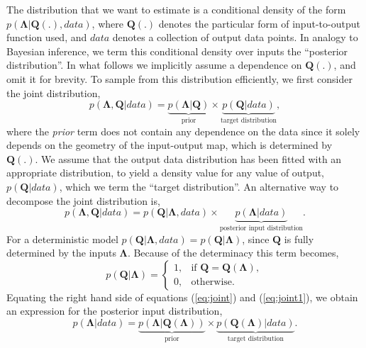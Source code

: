 \documentclass[10pt,letterpaper]{article}
\begin{document}
The distribution that we want to estimate is a conditional density of the form $p(\boldsymbol{\Lambda}|\boldsymbol{Q}(.),data)$, where $\boldsymbol{Q}(.)$ denotes the particular form of input-to-output function used, and $data$ denotes a collection of output data points. In analogy to Bayesian inference, we term this conditional density over inputs the ``posterior distribution''. In what follows we implicitly assume a dependence on $\boldsymbol{Q}(.)$, and omit it for brevity. To sample from this distribution efficiently, we first consider the joint distribution,
%
\begin{equation}\label{eq:joint}
p(\boldsymbol{\Lambda},\boldsymbol{Q}|data) = \underbrace{p(\boldsymbol{\Lambda}|\boldsymbol{Q})}_{\text{prior}} \times \underbrace{p(\boldsymbol{Q}|data)}_{\text{target distribution}},
\end{equation}
%
where the \textit{prior} term does not contain any dependence on the data since it solely depends on the geometry of the input-output map, which is determined by $\boldsymbol{Q}(.)$. We assume that the output data distribution has been fitted with an appropriate distribution, to yield a density value for any value of output, $p(\boldsymbol{Q}|data)$, which we term the ``target distribution''. An alternative way to decompose the joint distribution is,
%
\begin{equation}\label{eq:joint1}
p(\boldsymbol{\Lambda},\boldsymbol{Q}|data) = p(\boldsymbol{Q}|\boldsymbol{\Lambda},data) \times \underbrace{p(\boldsymbol{\Lambda}|data)}_{\text{posterior input distribution}}.
\end{equation}
%
For a deterministic model $p(\boldsymbol{Q}|\boldsymbol{\Lambda},data)=p(\boldsymbol{Q}|\boldsymbol{\Lambda})$, since $\boldsymbol{Q}$ is fully determined by the inputs $\boldsymbol{\Lambda}$. Because of the determinacy this term becomes,
%
\begin{equation}
p(\boldsymbol{Q}|\boldsymbol{\Lambda})=
\begin{cases}
1,              & \text{if } \boldsymbol{Q}=\boldsymbol{Q}(\boldsymbol{\Lambda}),\\
0,              & \text{otherwise}.
\end{cases}
\end{equation}
%
Equating the right hand side of equations (\ref{eq:joint}) and (\ref{eq:joint1}), we obtain an expression for the posterior input distribution,
%
\begin{equation}\label{eq:posterior}
p(\boldsymbol{\Lambda}|data) = \underbrace{p(\boldsymbol{\Lambda}|\boldsymbol{Q}(\boldsymbol{\Lambda}))}_{\text{prior}} \times \underbrace{p(\boldsymbol{Q}(\boldsymbol{\Lambda})|data)}_{\text{target distribution}}.
\end{equation}
\end{document}
